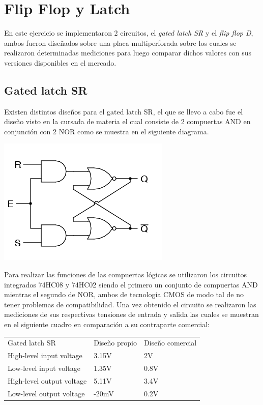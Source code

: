 \chapter{Flip Flop y Latch}


En este ejercicio se implementaron 2 circuitos, el \textit{gated latch SR} y el \textit{flip flop D}, ambos fueron diseñados sobre una placa multiperforada sobre los cuales se realizaron determinadas mediciones para luego comparar dichos valores con sus versiones disponibles en el mercado.
\section{Gated latch SR}
Existen distintos diseños para el gated latch SR, el que se llevo a cabo fue el diseño visto en la cursada de materia el cual consiste de 2 compuertas AND en conjunción con 2 NOR como se muestra en el siguiente diagrama.
\begin{center}
\includegraphics[scale=0.5]{../6-FlipFlop&Latch/E3 ej6 latch SR.png}
\end{center}
Para realizar las funciones de las compuertas lógicas se utilizaron los circuitos integrados 74HC08 y 74HC02 siendo el primero un conjunto de compuertas AND mientras el segundo de NOR, ambos de tecnología CMOS de modo tal de no tener problemas de compatibilidad. Una vez obtenido el circuito se realizaron las mediciones de sus respectivas tensiones de entrada y salida las cuales se muestran en el siguiente cuadro en comparación a su contraparte comercial:
\begin{table}[]
\begin{tabular}{lll}
Gated latch SR            & Diseño propio & Diseño comercial \\
High-level input voltage  & 3.15V         & 2V               \\
Low-level input voltage   & 1.35V         & 0.8V             \\
High-level output voltage & 5.11V         & 3.4V             \\
Low-level output voltage  & -20mV         & 0.2V            
\end{tabular}
\end{table}
